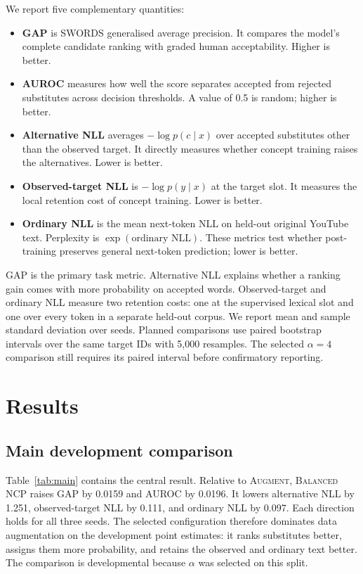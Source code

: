 \documentclass[11pt]{article}
\newcommand{\aug}{\textsc{Augment}}
\newcommand{\method}{\textsc{Balanced NCP}}
\begin{document}
We report five complementary quantities:
\begin{itemize}
    \item \textbf{GAP} is SWORDS generalised average precision. It compares the
    model's complete candidate ranking with graded human acceptability. Higher is
    better.
    \item \textbf{AUROC} measures how well the score separates accepted from
    rejected substitutes across decision thresholds. A value of 0.5 is random;
    higher is better.
    \item \textbf{Alternative NLL} averages $-\log p(c\mid x)$ over accepted
    substitutes other than the observed target. It directly measures whether
    concept training raises the alternatives. Lower is better.
    \item \textbf{Observed-target NLL} is $-\log p(y\mid x)$ at the target slot.
    It measures the local retention cost of concept training. Lower is better.
    \item \textbf{Ordinary NLL} is the mean next-token NLL on held-out original
    YouTube text. Perplexity is $\exp(\text{ordinary NLL})$. These metrics test
    whether post-training preserves general next-token prediction; lower is better.
\end{itemize}
GAP is the primary task metric. Alternative NLL explains whether a ranking gain
comes with more probability on accepted words. Observed-target and ordinary NLL
measure two retention costs: one at the supervised lexical slot and one over
every token in a separate held-out corpus. We report mean and sample standard
deviation over seeds. Planned comparisons use paired bootstrap intervals over
the same target IDs with 5,000 resamples. The selected $\alpha=4$ comparison
still requires its paired interval before confirmatory reporting.

\section{Results}

\subsection{Main development comparison}

Table~\ref{tab:main} contains the central result. Relative to \aug{}, \method{}
raises GAP by 0.0159 and AUROC by 0.0196. It lowers alternative NLL by 1.251,
observed-target NLL by 0.111, and ordinary NLL by 0.097. Each direction holds for
all three seeds. The selected configuration therefore dominates data
augmentation on the development point estimates: it ranks substitutes better,
assigns them more probability, and retains the observed and ordinary text better.
The comparison is developmental because $\alpha$ was selected on this split.
\end{document}
